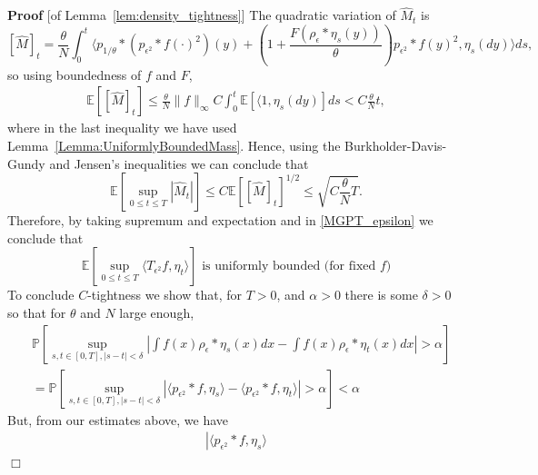 \documentclass[12pt]{article}
\newenvironment {proof}{{\noindent\bf Proof }}{\hfill $\Box$ \medskip}
\newcommand{\IP}{\mathbb P}
\newcommand{\IE}{\mathbb E}
\begin{document}
\begin{proof}[of Lemma~\ref{lem:density_tightness}]
    The quadratic variation of $\widehat{M}_t$ is
    \[
        [ \widehat{M} ]_t
        =
        \frac{\theta}{N} \int_0^t \langle
            p_{1/\theta}*(p_{\epsilon^2} * f(\cdot)^2)(y)
            +
            \left( 1 + \frac{F(\rho_\epsilon*\eta_s(y))}{\theta} \right)
            p_{\epsilon^2} * f(y)^2
            ,
            \eta_s(dy)
        \rangle ds ,
    \]
    so using boundedness of $f$ and $F$,
    \begin{align*}
        \IE\left[ [\widehat{M}]_t \right]
        \leq
        \frac{\theta}{N} \| f \|_\infty C
        \int_0^t \mathbb{E}\left[ \langle 1, \eta_s(dy) \right] ds
        <
        C \frac{\theta}{N} t ,
    \end{align*}
    where in the last inequality we have used Lemma~\ref{Lemma:UniformlyBoundedMass}.
    Hence, using the Burkholder-Davis-Gundy and Jensen's inequalities we can conclude that
    \[
        \IE[\sup_{0 \leq t \leq T} |\widehat{M}_t| ]
        \le
        C
        \IE\left[ [\widehat{M}]_t \right]^{1/2}
        \le
        \sqrt{ C \frac{\theta}{N} T } .
    \]
    Therefore, by taking supremum and expectation and in \eqref{MGPT_epsilon}
    we conclude that
    \begin{equation}
        \label{eq:boundedIntegralAgainstf}
        \IE[ \sup_{0 \leq t \leq T} \langle T_{\epsilon^2} f, \eta_t \rangle ]
        \text{ is uniformly bounded (for fixed } f \text{)}
    \end{equation}
    To conclude $C$-tightness we show that, for $T>0$, and $\alpha > 0$
    there is some $\delta >0$ so that for $\theta$ and $N$ large enough,
    \begin{align}
        &
        \IP\left[
            \sup_{s,t \in [0,T], |s-t| < \delta}
            \left|
                \int f(x) \rho_\epsilon*\eta_s(x) dx
                -
                \int f(x) \rho_\epsilon*\eta_t(x) dx
            \right|
            >
            \alpha
        \right]
        \\ &=
        \IP\left[
            \sup_{s,t \in [0,T], |s-t| < \delta}
            \left|
                \langle p_{\epsilon^2} * f, \eta_s \rangle
                - \langle p_{\epsilon^2} * f, \eta_t \rangle
            \right|
            >
            \alpha
        \right]
        <
        \alpha \label{conditionCtightness}
    \end{align}
    But, from our estimates above, we have
    \begin{align*}
        \left|
        \langle p_{\epsilon^2} * f, \eta_s \rangle

\end{align*}
\end{proof}
\end{document}
